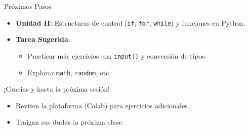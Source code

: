 \documentclass[10pt]{beamer}
\begin{document}
\begin{frame}{Próximos Pasos}
  \begin{itemize}
    \item \textbf{Unidad II:} Estructuras de control (\texttt{if}, \texttt{for}, \texttt{while}) y funciones en Python.
    \item \textbf{Tarea Sugerida}: 
      \begin{itemize}
        \item Practicar más ejercicios con \texttt{input()} y conversión de tipos.
        \item Explorar \texttt{math}, \texttt{random}, etc.
      \end{itemize}
  \end{itemize}
\end{frame}

\begin{frame}
  \huge{\centerline{¡Gracias y hasta la próxima sesión!}}
  \vspace{0.5cm}
  \normalsize
  \begin{itemize}
    \item Revisen la plataforma (Colab) para ejercicios adicionales.
    \item Traigan sus dudas la próxima clase.
  \end{itemize}
\end{frame}
\end{document}
